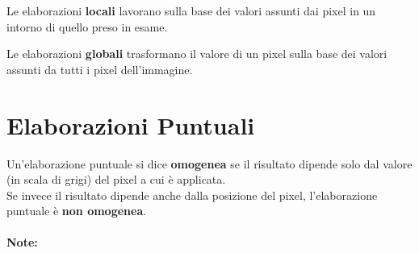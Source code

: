 \begin{definition}
    Le elaborazioni \textbf{locali} lavorano sulla base dei valori assunti dai pixel in
    un intorno di quello preso in esame.
\end{definition}

\begin{definition}
    Le elaborazioni \textbf{globali} trasformano il valore di un pixel sulla
    base dei valori assunti da tutti i pixel dell'immagine.
\end{definition}

\section{Elaborazioni Puntuali}

\begin{definition}
    Un'elaborazione puntuale si dice \textbf{omogenea} se il risultato
    dipende solo dal valore (in scala di grigi) del pixel a cui è applicata.\\
    Se invece il risultato dipende anche dalla posizione del pixel,
    l'elaborazione puntuale è \textbf{non omogenea}.
\end{definition}

\paragraph{Note:}

